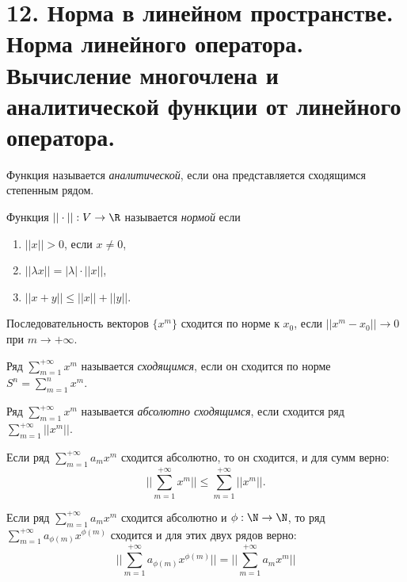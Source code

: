 \section{12. Норма в линейном пространстве. Норма линейного оператора. Вычисление многочлена и аналитической функции от линейного оператора.}

\begin{definition}
    Функция называется \textit{аналитической}, если она представляется сходящимся степенным рядом.
\end{definition}

\begin{definition}
    Функция $||\cdot||: V \to \R$ называется \textit{нормой} если 
    \begin{enumerate}
        \item $||x|| > 0$, если $x \neq 0$,
        \item $|| \lambda x|| = |\lambda| \cdot ||x||$,
        \item $||x + y|| \leq ||x|| + ||y||$.
    \end{enumerate}
\end{definition}

\begin{definition}
    Последовательность векторов $\{x^m\}$ сходится по норме к $x_0$, 
    если $||x^m - x_0|| \to 0$ при $m \to +\infty$.
\end{definition}

\begin{definition}
    Ряд $\displaystyle\sum_{m=1}^{+\infty} x^m$ называется \textit{сходящимся}, если он сходится по норме 
    $S^n = \displaystyle\sum_{m=1}^{n}x^m$.
\end{definition}

\begin{definition}
    Ряд $\displaystyle\sum_{m=1}^{+\infty} x^m$ называется \textit{абсолютно сходящимся}, если сходится ряд 
    $\displaystyle\sum_{m=1}^{+\infty} ||x^m||$.
\end{definition}

\begin{proposition}
    Если ряд $\displaystyle\sum_{m=1}^{+\infty} a_m x^m$ сходится абсолютно, то он сходится, 
    и для сумм верно:
    $$||\displaystyle\sum_{m=1}^{+\infty} x^m|| \leq \displaystyle\sum_{m=1}^{+\infty} ||x^m||.$$
\end{proposition}

\begin{proposition}
    Если ряд $\displaystyle\sum_{m=1}^{+\infty} a_m x^m$ сходится абсолютно и $\phi: \N \to \N$, то 
    ряд $\displaystyle\sum_{m=1}^{+\infty} a_{\phi(m)} x^{\phi(m)}$ сходится и для этих двух рядов 
    верно: $$||\displaystyle\sum_{m=1}^{+\infty} a_{\phi(m)} x^{\phi(m)}|| = 
    ||\displaystyle\sum_{m=1}^{+\infty} a_m x^m||$$
\end{proposition}


